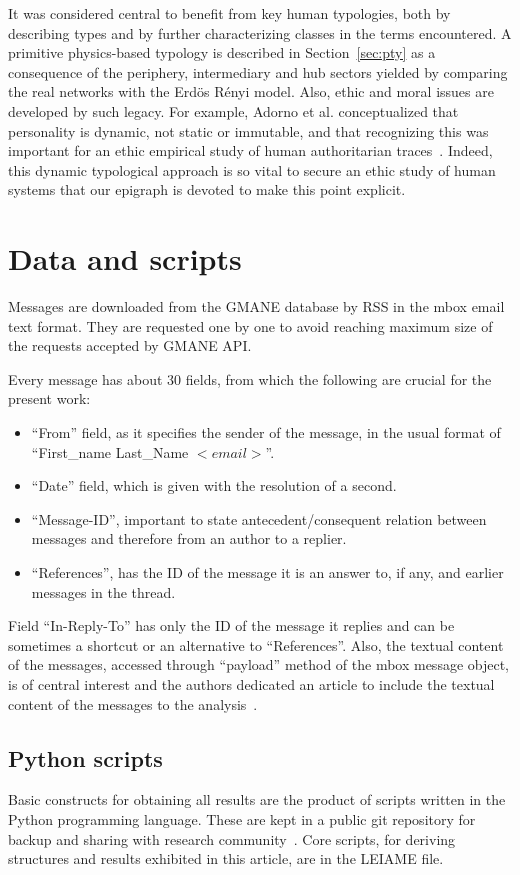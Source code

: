 \documentclass[%
 aip,
 jmp,%
 amsmath,amssymb,
 reprint,%
]{revtex4-1}
\begin{document}
It was considered central to benefit from key human typologies, both by describing types and by further characterizing classes in the terms encountered. A primitive physics-based typology is described in Section~\ref{sec:pty} as a consequence of the periphery, intermediary and hub sectors yielded by comparing the real networks with the Erd\"os R\'enyi model.
Also, ethic and moral issues are developed by such legacy. For example, Adorno et al. conceptualized that personality is dynamic, not static or immutable, and that recognizing this was important for an ethic empirical study of human authoritarian traces~\cite{adorno}.
Indeed, this dynamic typological approach is so vital to secure an ethic study of human systems that our epigraph is devoted to make this point explicit.



\section{Data and scripts}\label{scripts}
Messages are downloaded from the GMANE database by RSS in the mbox email text format. 
They are requested one by one to avoid reaching maximum size of the requests accepted by
GMANE API.

Every message has about 30 fields, from which the following are crucial
for the present work:
\begin{itemize}
    \item ``From'' field, as it specifies the sender of the message, in the usual format of ``First\_name Last\_Name $<email>$''.
    \item ``Date'' field, which is given with the resolution of a second.
    \item ``Message-ID'', important to state antecedent/consequent relation between messages and therefore from an author to a replier.
    \item ``References'', has the ID of the message it is an answer to, if any, and earlier messages in the thread.
\end{itemize}

Field ``In-Reply-To'' has only the ID of the message it replies and can be sometimes
a shortcut or an alternative to ``References''. Also, the textual content of the messages,
accessed through ``payload'' method of the mbox message object, is of central interest and
the authors dedicated an article to include the textual content of the messages to the analysis~\cite{rcText}.

\subsection{Python scripts}\label{ap:os}
Basic constructs for obtaining all results are the product of scripts written in the Python programming language. These are kept in a public git repository for backup and sharing with research community~\cite{scriptsFim}. Core scripts, for deriving structures and results exhibited in this article, are in the LEIAME file.
\end{document}
